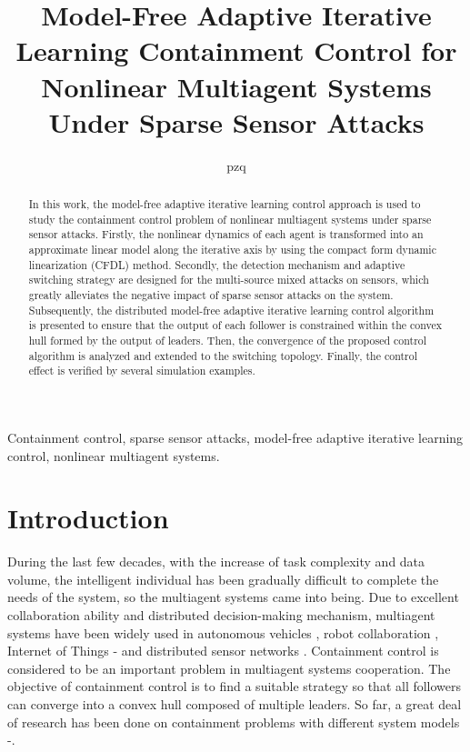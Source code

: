 \documentclass[journal,onecolumn]{IEEEtran}
\title{\LARGE Model-Free Adaptive Iterative Learning Containment Control for Nonlinear Multiagent Systems Under Sparse Sensor Attacks}
\author{pzq}
\begin{document}
 \maketitle

\begin{abstract}
In this work, the model-free adaptive iterative learning control approach is used to study the containment control problem of nonlinear multiagent systems under sparse  sensor attacks. Firstly, the nonlinear dynamics of each agent is transformed into an approximate linear model along the iterative axis by using the compact form dynamic linearization (CFDL) method. Secondly, the detection mechanism and adaptive switching strategy are designed for the multi-source mixed attacks on sensors, which greatly alleviates the negative impact of sparse sensor attacks on the system. Subsequently, the distributed model-free adaptive iterative learning control algorithm is presented to ensure that the output of each follower is constrained within the convex hull formed by the output of leaders. Then, the convergence of the proposed control algorithm is analyzed and extended to the switching topology. Finally, the control effect is verified by several simulation examples.
\end{abstract}

\begin{keywords} Containment control, sparse sensor attacks, model-free adaptive iterative learning control, nonlinear multiagent systems.
\end{keywords}



\section{Introduction}\label{section:1}
During the last few decades, with the increase of task complexity and data volume, the intelligent individual has been gradually difficult to complete the needs of the system, so the multiagent systems came into being. Due to excellent collaboration ability and distributed decision-making mechanism, multiagent systems have been widely used in autonomous vehicles \cite{1}, robot collaboration \cite{2}, Internet of Things \cite{3}-\cite{4} and distributed sensor networks \cite{5}. Containment control is considered to be an important problem in multiagent systems cooperation. The objective of containment control is to find a suitable strategy so that all followers can converge into a convex hull composed of multiple leaders. So far, a great deal of research has been done on containment problems with different system models \cite{6}-\cite{9}.
\end{document}

